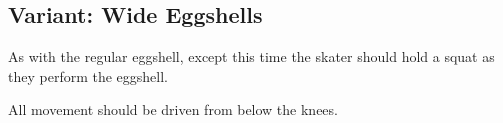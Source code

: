\subsection*{Variant: Wide Eggshells}
\label{drill:sticky/eggshells/squat}

As with the regular eggshell, except this time the skater should hold a squat as they perform the eggshell.

All movement should be driven from below the knees.
